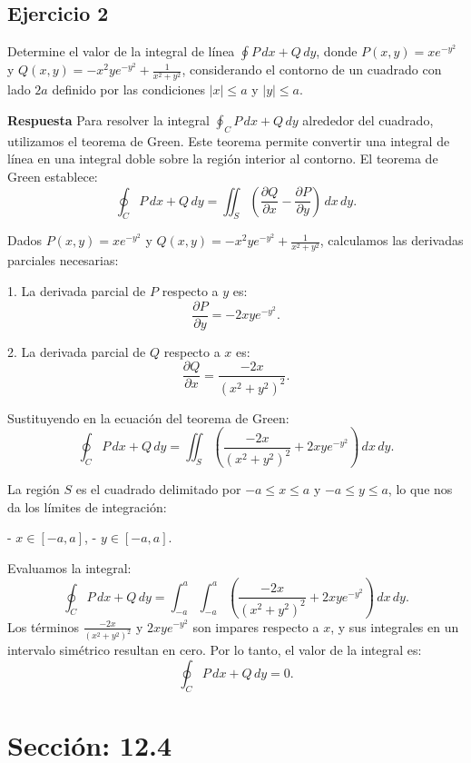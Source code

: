 \documentclass{report}
\begin{document}
\subsection*{Ejercicio 2}
Determine el valor de la integral de línea \(\oint P \, dx + Q \, dy\), donde \(P(x, y) = x e^{-y^2}\) y \(Q(x, y) = -x^2 y e^{-y^2} + \frac{1}{x^2 + y^2}\), considerando el contorno de un cuadrado con lado \(2a\) definido por las condiciones \(|x| \leq a\) y \(|y| \leq a\).

\textbf{Respuesta}
Para resolver la integral \(\oint_C P \, dx + Q \, dy\) alrededor del cuadrado, utilizamos el teorema de Green. Este teorema permite convertir una integral de línea en una integral doble sobre la región interior al contorno. El teorema de Green establece:
\[
\oint_C P \, dx + Q \, dy = \iint_S \left( \frac{\partial Q}{\partial x} - \frac{\partial P}{\partial y} \right) \, dx \, dy.
\]

Dados \(P(x, y) = x e^{-y^2}\) y \(Q(x, y) = -x^2 y e^{-y^2} + \frac{1}{x^2 + y^2}\), calculamos las derivadas parciales necesarias:

1. La derivada parcial de \(P\) respecto a \(y\) es:
\[
\frac{\partial P}{\partial y} = -2 x y e^{-y^2}.
\]

2. La derivada parcial de \(Q\) respecto a \(x\) es:
\[
\frac{\partial Q}{\partial x} = \frac{-2x}{(x^2 + y^2)^2}.
\]

Sustituyendo en la ecuación del teorema de Green:
\[
\oint_C P \, dx + Q \, dy = \iint_S \left( \frac{-2x}{(x^2 + y^2)^2} + 2xy e^{-y^2} \right) \, dx \, dy.
\]

La región \(S\) es el cuadrado delimitado por \(-a \leq x \leq a\) y \(-a \leq y \leq a\), lo que nos da los límites de integración:

- \(x \in [-a, a]\),
- \(y \in [-a, a]\).

Evaluamos la integral:
\[
\oint_C P \, dx + Q \, dy = \int_{-a}^{a} \int_{-a}^{a} \left( \frac{-2x}{(x^2 + y^2)^2} + 2xy e^{-y^2} \right) \, dx \, dy.
\]
Los términos \(\frac{-2x}{(x^2 + y^2)^2}\) y \(2xy e^{-y^2}\) son impares respecto a \(x\), y sus integrales en un intervalo simétrico resultan en cero. Por lo tanto, el valor de la integral es:
\[
\oint_C P \, dx + Q \, dy = 0.
\]
\section*{\textcolor{color124}{Sección: 12.4}}
\end{document}
